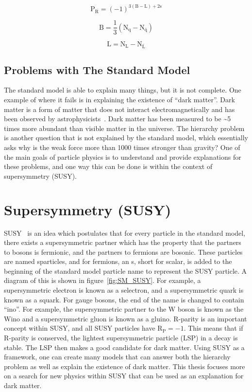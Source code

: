 \begin{equation}
\label{eqn:rparity}
\mathrm{P_{R} = (-1)^{3(B-L)+2s}}
\end{equation}

\begin{equation}
\label{eqn:baryonnumber}
\mathrm{B = \frac{1}{3}(N_{q}-N_{\bar{q}})}
\end{equation}

\begin{equation}
\label{eqn:leptonnumber}
\mathrm{L = N_{L}-N_{\bar{L}}}
\end{equation}

\subsection{Problems with The Standard Model}
The standard model is able to explain many things, but it is not complete.
One example of where it fails is in explaining the existence of ``dark matter''.
Dark matter is a form of matter that does not interact electromagnetically and has been observed by astrophysicists~\cite{darkmatter}.
Dark matter has been measured to be \textasciitilde{}5 times more abundant than visible matter in the universe.
The hierarchy problem is another question that is not explained by the standard model,
which essentially asks why is the weak force more than 1000 times stronger than gravity?
One of the main goals of particle physics is to understand and provide explanations for these problems,
and one way this can be done is within the context of supersymmetry (SUSY).

\section{Supersymmetry (SUSY)}
SUSY~\cite{SUSYPrimer} is an idea which postulates that for every particle in the standard model,
there exists a supersymmetric partner which has the property that the partners to bosons is fermionic, and the partners to fermions are bosonic.
These particles are named sparticles, and for fermions, an s, short for scalar, is added to the beginning of the standard model particle name to represent the SUSY particle.
A diagram of this is shown in figure~\ref{fig:SM_SUSY}.
For example, a supersymmetric electron is known as a selectron, and a supersymmetric quark is known as a squark.
For gauge bosons, the end of the name is changed to contain ``ino''.
For example, the supersymmetric partner to the W boson is known as the Wino and a supersymmetric gluon is known as a gluino.
R-parity is an important concept within SUSY, and all SUSY particles have $\mathrm{R_{P}} = -1$.
This means that if R-parity is conserved, the lightest supersymmetric particle (LSP) in a decay is stable.
The LSP then makes a good candidate for dark matter.
Using SUSY as a framework, one can create many models that can answer both the hierarchy problem as well as explain the existence of dark matter.
This thesis focuses more on a search for new physics within SUSY that can be used as an explanation for dark matter.

